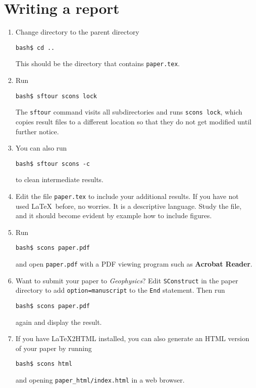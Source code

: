 \lstset{language=python,numbers=left,numberstyle=\tiny,showstringspaces=false}




\lstset{language=python,numbers=left,numberstyle=\tiny,showstringspaces=false}


\section{Writing a report}

\begin{enumerate}
\item Change directory to the parent directory
\begin{verbatim}
bash$ cd ..
\end{verbatim}
This should be the directory that contains \texttt{paper.tex}.
\item Run
\begin{verbatim}
bash$ sftour scons lock
\end{verbatim}
The \texttt{sftour} command visits all subdirectories and runs \texttt{scons lock}, which copies result files to a different location so that they do not get modified until further notice.
\item You can also run
\begin{verbatim}
bash$ sftour scons -c
\end{verbatim}
to clean intermediate results.
\item Edit the file \texttt{paper.tex} to include your additional results. If you have not used \LaTeX\ before, no worries. It is a descriptive language. Study the file, and it should become evident by example how to include figures.
\item Run
\begin{verbatim}
bash$ scons paper.pdf
\end{verbatim}
and open \texttt{paper.pdf} with a PDF viewing program such as \textbf{Acrobat Reader}. 
\item Want to submit your paper to \emph{Geophysics}? Edit \texttt{SConstruct} in the 
paper directory to add \texttt{option=manuscript} to the \texttt{End} statement. Then run
\begin{verbatim}
bash$ scons paper.pdf
\end{verbatim}
again and display the result.
\item If you have \LaTeX2HTML installed, you can also generate an HTML version of your paper by running
\begin{verbatim}
bash$ scons html
\end{verbatim}
and opening \verb#paper_html/index.html# in a web browser.
\end{enumerate}

\lstset{language=python,numbers=left,numberstyle=\tiny,showstringspaces=false}







